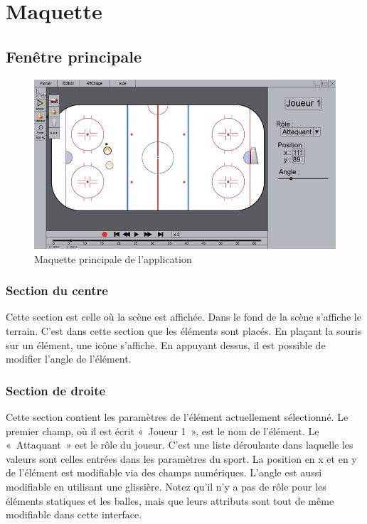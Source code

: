 \chapter{Maquette}
\label{s:mockup}

\section{Fenêtre principale}

\begin{figure}[H]
	\centering
	\includegraphics[width=\textwidth]{mockup/mockup.png}
	\caption{Maquette principale de l'application}
	\label{fig:mock-up}
\end{figure}

\subsection{Section du centre}

Cette section est celle où la scène est affichée. Dans le fond de la scène s'affiche le terrain. C'est dans cette section que les éléments sont placés. En plaçant la souris sur un élément, une icône s'affiche. En appuyant dessus, il est possible de modifier l'angle de l'élément.

\subsection{Section de droite}

Cette section contient les paramètres de l'élément actuellement sélectionné. Le premier champ, où il est écrit «~Joueur 1~», est le nom de l'élément. Le «~Attaquant~» est le rôle du joueur. C'est une liste déroulante dans laquelle les valeurs sont celles entrées dans les paramètres du sport. La position en x et en y de l'élément est modifiable via des champs numériques. L'angle est aussi modifiable en utilisant une glissière. Notez qu'il n'y a pas de rôle pour les éléments statiques et les balles, mais que leurs attributs sont tout de même modifiable dans cette interface.

